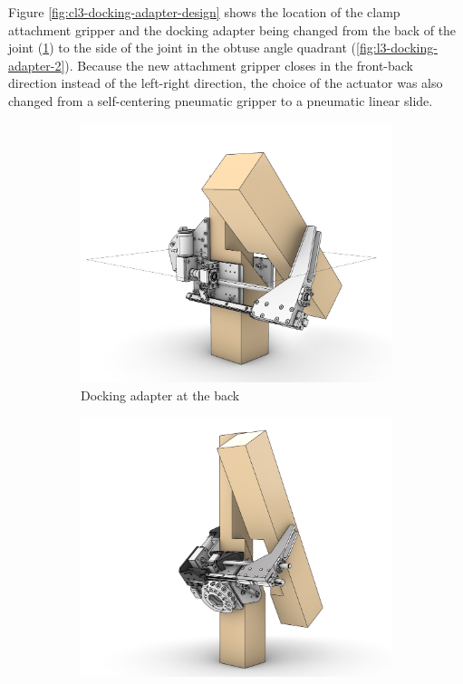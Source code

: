 Figure \ref{fig:cl3-docking-adapter-design} shows the location of the clamp attachment gripper and the docking adapter being changed from the back of the joint (\ref{fig:l3-docking-adapter-1}) to the side of the joint in the obtuse angle quadrant (\ref{fig:l3-docking-adapter-2}). Because the new attachment gripper closes in the front-back direction instead of the left-right direction, the choice of the actuator was also changed from a self-centering pneumatic gripper to a pneumatic linear slide.

\begin{figure}
    \centering
    \begin{subfigure}[b]{0.49\textwidth}
        \centering
        \includegraphics[width=\textwidth]{images/05/cl3-docking-old.jpg}
        \caption{Docking adapter at the back}
        \label{fig:l3-docking-adapter-1}
    \end{subfigure}
    \hfill
    \begin{subfigure}[b]{0.49\textwidth}
        \centering
        \includegraphics[width=\textwidth]{images/05/cl3-docking.jpg}

\end{subfigure}
\end{figure}
